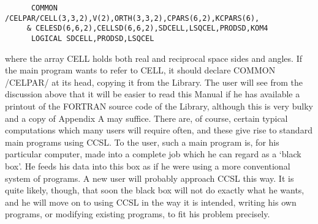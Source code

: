 {\begin{verbatim}
      COMMON /CELPAR/CELL(3,3,2),V(2),ORTH(3,3,2),CPARS(6,2),KCPARS(6),
     & CELESD(6,6,2),CELLSD(6,6,2),SDCELL,LSQCEL,PRODSD,KOM4
      LOGICAL SDCELL,PRODSD,LSQCEL
\end{verbatim}\rm
\par 
where the array CELL holds both real and reciprocal space sides and angles.
If the main program wants to refer to CELL, it should declare
COMMON /CELPAR/ at its head, copying it from the Library.
\pn 
The user will see from the discussion above that it will be easier to
read this Manual if he has available a printout of the FORTRAN source
code of the Library, although this is very bulky and a copy of Appendix
A may suffice.
\pn 
There are, of course, certain typical computations which many users will
require often, and these give rise to standard main programs using CCSL.
To the user, such a main program is, for his particular computer, made
into a complete job which he can regard as a `black box'.  He feeds his
data into this box as if he were using a more conventional system of
programs.
\pn 
A new user will probably approach CCSL this way.  It is quite likely,
though, that soon the black box will not do exactly what he wants, and
he will move on to using CCSL in the way it is intended, writing his own
programs, or modifying existing programs, to fit his problem precisely.
\p
% 
}
